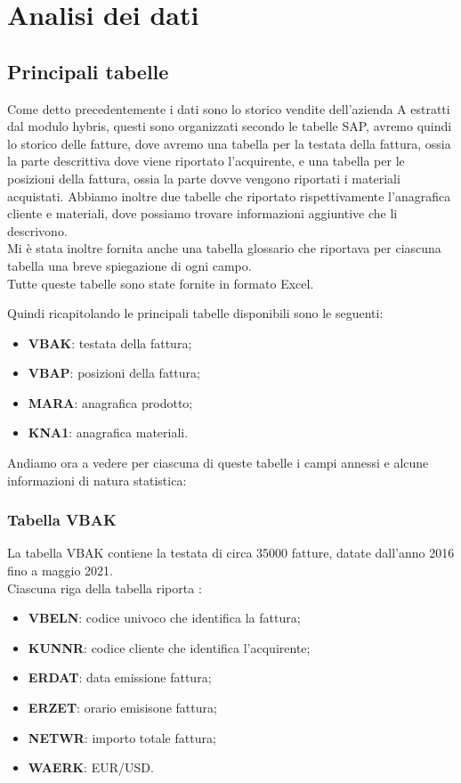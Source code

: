 
\hypertarget{(chap:capitolo3)}{}
\chapter{Analisi dei dati}
\section{Principali tabelle}
Come detto precedentemente i dati sono lo storico vendite dell'azienda A estratti dal modulo hybris, questi sono organizzati secondo le tabelle SAP, avremo quindi lo storico delle fatture, dove avremo una tabella per la testata della fattura, ossia la parte descrittiva dove viene riportato l'acquirente, e una tabella per le posizioni della fattura, ossia la parte dovve vengono riportati i materiali acquistati. Abbiamo inoltre due tabelle che riportato rispettivamente l'anagrafica cliente e materiali, dove possiamo trovare informazioni aggiuntive che li descrivono.\\Mi è stata inoltre fornita anche una tabella glossario che riportava per ciascuna tabella una breve spiegazione di ogni campo. \\
Tutte queste tabelle sono state fornite in formato Excel.

Quindi ricapitolando le principali tabelle disponibili sono le seguenti:
\begin{itemize}
	\item \textbf{VBAK}: testata della fattura;
	\item \textbf{VBAP}: posizioni della fattura;
	\item \textbf{MARA}: anagrafica prodotto;
	\item \textbf{KNA1}: anagrafica materiali.
\end{itemize}

Andiamo ora a vedere per ciascuna di queste tabelle i campi annessi e alcune informazioni di natura statistica:
\subsection{Tabella VBAK}
La tabella VBAK contiene la testata di circa 35000 fatture, datate dall'anno 2016 fino a maggio 2021.\\
Ciascuna riga della tabella riporta :
\begin{itemize}
	\item \textbf{VBELN}: codice univoco che identifica la fattura;
	\item \textbf{KUNNR}: codice cliente che identifica l'acquirente;
	\item \textbf{ERDAT}: data emissione fattura;
	\item \textbf{ERZET}: orario emisisone fattura;
	\item \textbf{NETWR}: importo totale fattura;
	\item \textbf{WAERK}: EUR/USD.
\end{itemize}

